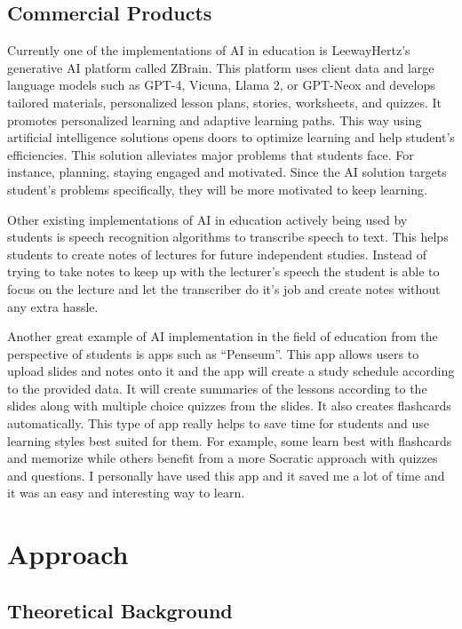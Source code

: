 \documentclass{imc-inf}
\begin{document}
\section{Commercial Products }
Currently one of the implementations of AI in education is LeewayHertz’s generative AI platform called ZBrain. This platform uses client data and large language models such as GPT-4, Vicuna, Llama 2, or GPT-Neox and develops tailored materials, personalized lesson plans, stories, worksheets, and quizzes. It promotes personalized learning and adaptive learning paths. This way using artificial intelligence solutions opens doors to optimize learning and help student’s efficiencies. 
This solution alleviates major problems that students face. For instance, planning, staying engaged and motivated. Since the AI solution targets student’s problems specifically, they will be more motivated to keep learning. 

Other existing implementations of AI in education actively being used by students is speech recognition algorithms to transcribe speech to text. This helps students to create notes of lectures for future independent studies. Instead of trying to take notes to keep up with the lecturer’s speech the student is able to focus on the lecture and let the transcriber do it’s job and create notes without any extra hassle. 

Another great example of AI implementation in the field of education from the perspective of students is apps such as “Penseum”. This app allows users to upload slides and notes onto it and the app will create a study schedule according to the provided data. It will create summaries of the lessons according to the slides along with multiple choice quizzes from the slides. It also creates flashcards automatically. This type of app really helps to save time for students and use learning styles best suited for them. For example, some learn best with flashcards and memorize while others benefit from a more Socratic approach with quizzes and questions. I personally have used this app and it saved me a lot of time and it was an easy and interesting way to learn. 






\chapter{Approach}

\section{Theoretical Background }
\end{document}
